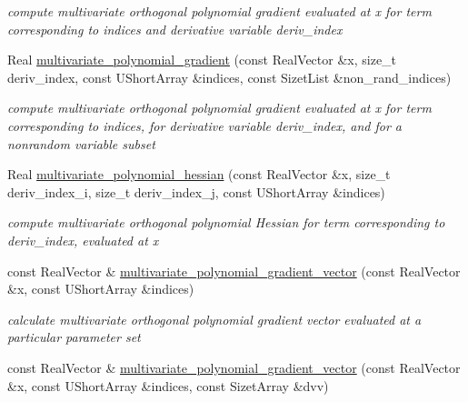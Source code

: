 \begin{DoxyCompactItemize}
\begin{DoxyCompactList}\small\item\em compute multivariate orthogonal polynomial gradient evaluated at x for term corresponding to indices and derivative variable deriv\+\_\+index \end{DoxyCompactList}\item 
Real \hyperlink{classPecos_1_1SharedOrthogPolyApproxData_a6ca056d626fe196f86c6e3e83ce6e59f}{multivariate\+\_\+polynomial\+\_\+gradient} (const Real\+Vector \&x, size\+\_\+t deriv\+\_\+index, const U\+Short\+Array \&indices, const Sizet\+List \&non\+\_\+rand\+\_\+indices)
\begin{DoxyCompactList}\small\item\em compute multivariate orthogonal polynomial gradient evaluated at x for term corresponding to indices, for derivative variable deriv\+\_\+index, and for a nonrandom variable subset \end{DoxyCompactList}\item 
Real \hyperlink{classPecos_1_1SharedOrthogPolyApproxData_a3bdb695c8bd2207a8fac05b345960f18}{multivariate\+\_\+polynomial\+\_\+hessian} (const Real\+Vector \&x, size\+\_\+t deriv\+\_\+index\+\_\+i, size\+\_\+t deriv\+\_\+index\+\_\+j, const U\+Short\+Array \&indices)\label{classPecos_1_1SharedOrthogPolyApproxData_a3bdb695c8bd2207a8fac05b345960f18}

\begin{DoxyCompactList}\small\item\em compute multivariate orthogonal polynomial Hessian for term corresponding to deriv\+\_\+index, evaluated at x \end{DoxyCompactList}\item 
const Real\+Vector \& \hyperlink{classPecos_1_1SharedOrthogPolyApproxData_a3f1d99f04ecf6f8d8bec6163bc83b657}{multivariate\+\_\+polynomial\+\_\+gradient\+\_\+vector} (const Real\+Vector \&x, const U\+Short\+Array \&indices)\label{classPecos_1_1SharedOrthogPolyApproxData_a3f1d99f04ecf6f8d8bec6163bc83b657}

\begin{DoxyCompactList}\small\item\em calculate multivariate orthogonal polynomial gradient vector evaluated at a particular parameter set \end{DoxyCompactList}\item 
const Real\+Vector \& \hyperlink{classPecos_1_1SharedOrthogPolyApproxData_af31e66c016dda59ca47b3c24f5e97793}{multivariate\+\_\+polynomial\+\_\+gradient\+\_\+vector} (const Real\+Vector \&x, const U\+Short\+Array \&indices, const Sizet\+Array \&dvv)\label{classPecos_1_1SharedOrthogPolyApproxData_af31e66c016dda59ca47b3c24f5e97793}


\end{DoxyCompactItemize}
